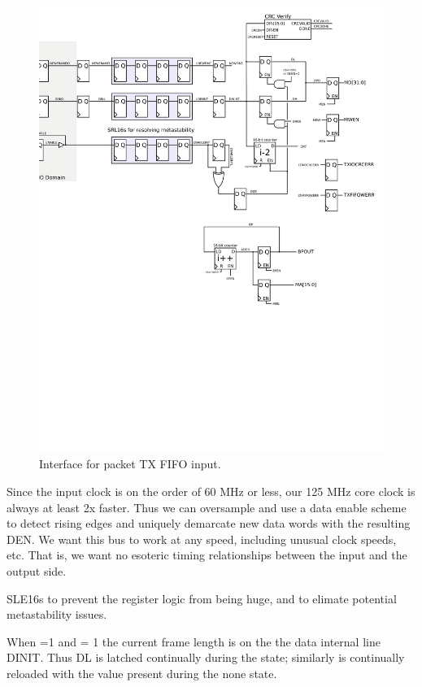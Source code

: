 \begin{figure}
\label{txinput}
\includegraphics[scale=0.7]{txinput.svg}
\caption{Interface for packet TX FIFO input.}
\end{figure}

Since the input clock is on the order of 60 MHz or less, our 125 MHz
core clock is always at least 2x faster. Thus we can oversample and
use a data enable scheme to detect rising edges and uniquely demarcate
new data words with the resulting DEN. We want this bus to work at any
speed, including unusual clock speeds, etc. That is, we want no
esoteric timing relationships between the input and the output side.

SLE16s to prevent the register logic from being huge, and to elimate
potential metastability issues.

When  =1 and  = 1 the current frame
length is on the the data internal line DINIT. Thus DL is latched
continually during the  state; similarly  is
continually reloaded with the value present during the none state.

